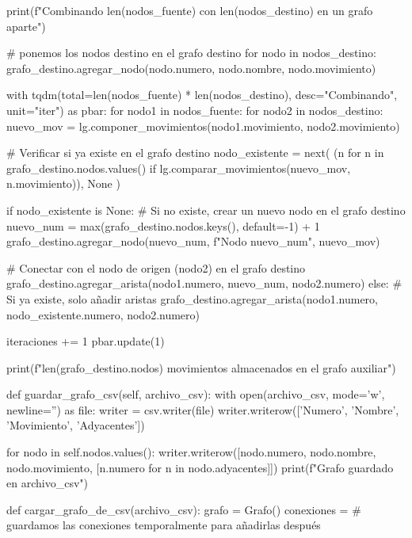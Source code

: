         print(f"Combinando {len(nodos_fuente)} con {len(nodos_destino)} en un grafo aparte")
        
        # ponemos los nodos destino en el grafo destino
        for nodo in nodos_destino:
            grafo_destino.agregar_nodo(nodo.numero, nodo.nombre, nodo.movimiento)

        with tqdm(total=len(nodos_fuente) * len(nodos_destino), desc="Combinando", unit="iter") as pbar:
            for nodo1 in nodos_fuente:
                for nodo2 in nodos_destino:
                    nuevo_mov = lg.componer_movimientos(nodo1.movimiento, nodo2.movimiento)

                    # Verificar si ya existe en el grafo destino
                    nodo_existente = next(
                        (n for n in grafo_destino.nodos.values() if lg.comparar_movimientos(nuevo_mov, n.movimiento)), 
                        None
                    )

                    if nodo_existente is None:
                        # Si no existe, crear un nuevo nodo en el grafo destino
                        nuevo_num = max(grafo_destino.nodos.keys(), default=-1) + 1
                        grafo_destino.agregar_nodo(nuevo_num, f"Nodo {nuevo_num}", nuevo_mov)
                        
                        # Conectar con el nodo de origen (nodo2) en el grafo destino
                        grafo_destino.agregar_arista(nodo1.numero, nuevo_num, nodo2.numero)
                    else:
                        # Si ya existe, solo añadir aristas
                        grafo_destino.agregar_arista(nodo1.numero, nodo_existente.numero, nodo2.numero)

                    iteraciones += 1
                    pbar.update(1)

        print(f"{len(grafo_destino.nodos)} movimientos almacenados en el grafo auxiliar")

    
    def guardar_grafo_csv(self, archivo_csv):
        with open(archivo_csv, mode='w', newline='') as file:
            writer = csv.writer(file)
            writer.writerow(['Numero', 'Nombre', 'Movimiento', 'Adyacentes'])
            
            for nodo in self.nodos.values():
                writer.writerow([nodo.numero, nodo.nombre, nodo.movimiento, [n.numero for n in nodo.adyacentes]])
            print(f"Grafo guardado en {archivo_csv}")


def cargar_grafo_de_csv(archivo_csv):
    grafo = Grafo()
    conexiones = {} # guardamos las conexiones temporalmente para añadirlas después
    
